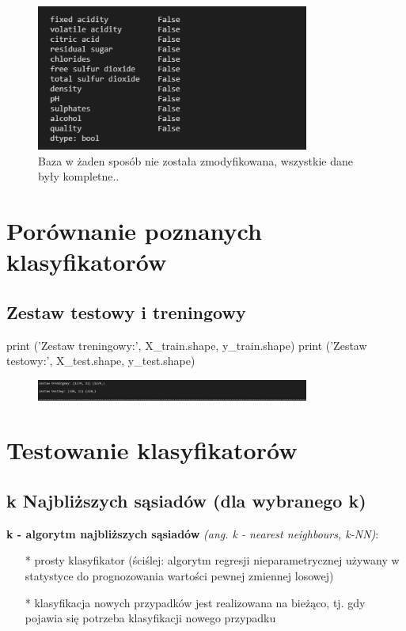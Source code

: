 \documentclass{article}
\begin{document}
\begin{figure}[!htb]
\centering
\includegraphics[width=0.8\textwidth]{image/data.png}
\caption{Baza w żaden sposób nie została zmodyfikowana, wszystkie dane były kompletne..}
\end{figure}

\section{Porównanie poznanych klasyfikatorów}

\subsection{Zestaw testowy i treningowy}

\begin{python}
print ('Zestaw treningowy:', X_train.shape,  y_train.shape)
print ('Zestaw testowy:', X_test.shape,  y_test.shape)
\end{python}

\begin{figure}[!htb]
\centering
\includegraphics[width=0.8\textwidth]{image/zestaw.png}
\end{figure}

\section{Testowanie klasyfikatorów}

\subsection{k Najbliższych sąsiadów (dla wybranego k)}
\textbf{k - algorytm najbliższych sąsiadów} \emph{(ang. k - nearest neighbours, k-NN)}:
\begin{itemize}
\item[*] prosty klasyfikator (ściślej: algorytm regresji nieparametrycznej używany w statystyce do prognozowania wartości pewnej zmiennej losowej)
\item[*] klasyfikacja nowych przypadków jest realizowana na
bieżąco, tj. gdy pojawia się potrzeba klasyfikacji nowego
przypadku
\end{itemize}
\end{document}
